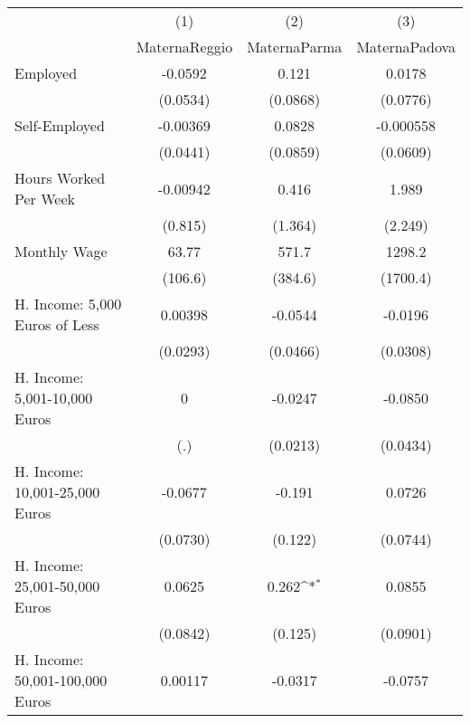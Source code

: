 {
\def\sym#1{\ifmmode^{#1}\else\(^{#1}\)\fi}
\begin{tabular}{l*{3}{c}}
\hline\hline
            &\multicolumn{1}{c}{(1)}&\multicolumn{1}{c}{(2)}&\multicolumn{1}{c}{(3)}\\
            &\multicolumn{1}{c}{MaternaReggio}&\multicolumn{1}{c}{MaternaParma}&\multicolumn{1}{c}{MaternaPadova}\\
\hline
Employed    &     -0.0592         &       0.121         &      0.0178         \\
            &    (0.0534)         &    (0.0868)         &    (0.0776)         \\
[1em]
Self-Employed&    -0.00369         &      0.0828         &   -0.000558         \\
            &    (0.0441)         &    (0.0859)         &    (0.0609)         \\
[1em]
Hours Worked Per Week&    -0.00942         &       0.416         &       1.989         \\
            &     (0.815)         &     (1.364)         &     (2.249)         \\
[1em]
Monthly Wage&       63.77         &       571.7         &      1298.2         \\
            &     (106.6)         &     (384.6)         &    (1700.4)         \\
[1em]
H. Income: 5,000 Euros of Less&     0.00398         &     -0.0544         &     -0.0196         \\
            &    (0.0293)         &    (0.0466)         &    (0.0308)         \\
[1em]
H. Income: 5,001-10,000 Euros&           0         &     -0.0247         &     -0.0850         \\
            &         (.)         &    (0.0213)         &    (0.0434)         \\
[1em]
H. Income: 10,001-25,000 Euros&     -0.0677         &      -0.191         &      0.0726         \\
            &    (0.0730)         &     (0.122)         &    (0.0744)         \\
[1em]
H. Income: 25,001-50,000 Euros&      0.0625         &       0.262\sym{*}  &      0.0855         \\
            &    (0.0842)         &     (0.125)         &    (0.0901)         \\
[1em]
H. Income: 50,001-100,000 Euros&     0.00117         &     -0.0317         &     -0.0757         \\

\end{tabular}}
